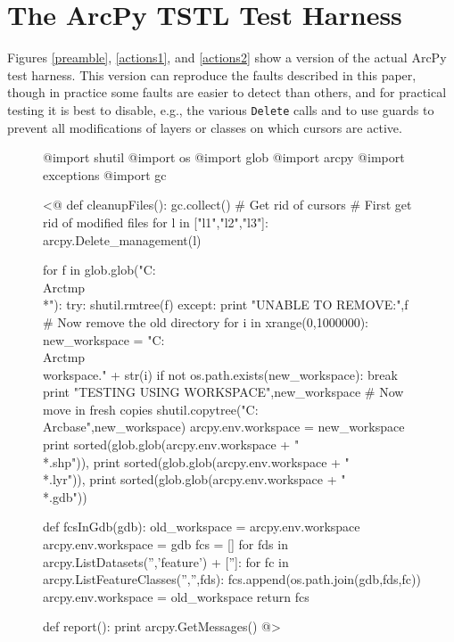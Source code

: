 \section{The ArcPy TSTL Test Harness}

Figures \ref{preamble}, \ref{actions1}, and \ref{actions2} show a
version of the actual ArcPy test harness.  This version can reproduce the faults
described in this paper, though in practice some faults are easier to
detect than others, and for practical testing it is best to disable,
e.g., the various {\tt Delete} calls and to use guards to prevent all modifications of
layers or classes on which cursors are active.

\begin{figure}
{\scriptsize
\begin{code}
@import shutil
@import os
@import glob
@import arcpy
@import exceptions
@import gc

<@
def cleanupFiles():
    gc.collect() \# Get rid of cursors
    \# First get rid of modified files
    for l in ["l1","l2","l3"]:
    	arcpy.Delete\_management(l)
    
    for f in glob.glob("C:\\Arctmp\\*"):
        try:
            shutil.rmtree(f)
        except:
            print "UNABLE TO REMOVE:",f
    \# Now remove the old directory
    for i in xrange(0,1000000):
        new\_workspace = "C:\\Arctmp\\workspace." + str(i)
        if not os.path.exists(new\_workspace):
            break             
    print "TESTING USING WORKSPACE",new\_workspace
    \# Now move in fresh copies
    shutil.copytree("C:\\Arcbase",new\_workspace)
    arcpy.env.workspace = new\_workspace
    print sorted(glob.glob(arcpy.env.workspace + "\\*.shp")),
    print sorted(glob.glob(arcpy.env.workspace + "\\*.lyr")),
    print sorted(glob.glob(arcpy.env.workspace + "\\*.gdb"))


def fcsInGdb(gdb):
    old\_workspace = arcpy.env.workspace
    arcpy.env.workspace = gdb
    fcs = []
    for fds in arcpy.ListDatasets('','feature') + ['']:
        for fc in arcpy.ListFeatureClasses('','',fds):
            fcs.append(os.path.join(gdb,fds,fc))
    arcpy.env.workspace = old\_workspace
    return fcs

def report():
    print arcpy.GetMessages()
@>


\end{code}}
\end{figure}
